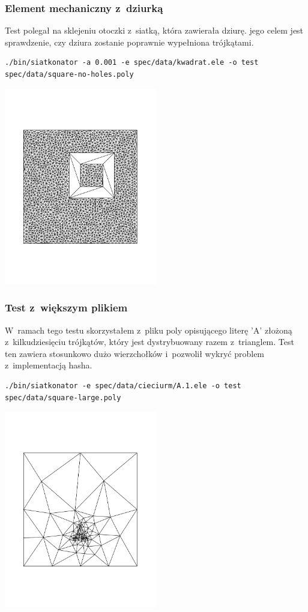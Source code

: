 \documentclass[a4paper]{article} \usepackage{setspace}
\begin{document}
\subsubsection{Element mechaniczny z~dziurką}
Test polegał na sklejeniu otoczki z~siatką, która zawierała dziurę.
jego celem jest sprawdzenie, czy dziura zostanie poprawnie wypełniona trójkątami.
\begin{lstlisting}
./bin/siatkonator -a 0.001 -e spec/data/kwadrat.ele -o test spec/data/square-no-holes.poly
\end{lstlisting}
\includegraphics[width=0.5\textwidth]{dziurka.pdf}

\subsubsection{Test z~większym plikiem}
W~ramach tego testu skorzystałem z~pliku poly opisującego literę 'A' złożoną z~kilkudziesięciu trójkątów, który jest dystrybuowany razem z~trianglem.
Test ten zawiera stosunkowo dużo wierzchołków i~pozwolił wykryć problem z~implementacją hasha.
\begin{lstlisting}
./bin/siatkonator -e spec/data/cieciurm/A.1.ele -o test spec/data/square-large.poly
\end{lstlisting}
\includegraphics[width=0.5\textwidth]{litera_a.pdf}
\end{document}

